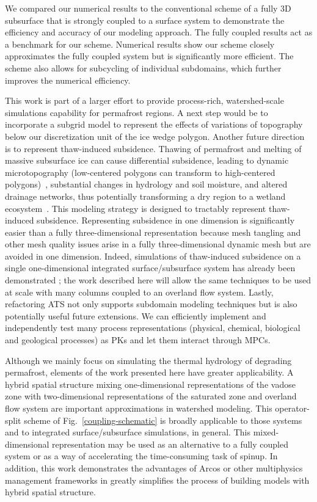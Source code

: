 \documentclass[review]{elsarticle}
\begin{document}
We compared our numerical results to the conventional scheme of a fully 3D subsurface that is strongly coupled to a surface system to demonstrate the efficiency and accuracy of our modeling approach. The fully coupled results act as a benchmark for our scheme. Numerical results show our scheme closely approximates the fully coupled system but is significantly more efficient. The scheme also allows for subcycling of individual subdomains, which further improves the numerical efficiency. 

This work is part of a larger effort to provide process-rich, watershed-scale simulations capability for permafrost regions.  A next step would be to incorporate a subgrid model to represent the effects of  variations of topography below our discretization unit of the ice wedge polygon. Another future direction is to represent thaw-induced subsidence. Thawing of permafrost and melting of massive subsurface ice can cause differential subsidence, leading to dynamic microtopography (low-centered polygons can transform to high-centered polygons)~\cite{jorgenson2006abrupt,liljedahl2012ice}, substantial changes in hydrology and soil moisture, and altered drainage networks, thus potentially transforming a dry region to a wetland ecosystem~\cite{hinzman2005evidence,rowland2010arctic}. This modeling strategy is designed to tractably represent  thaw-induced subsidence. Representing subsidence in one dimension is significantly easier than a fully three-dimensional representation because mesh tangling and other mesh quality issues arise in a fully three-dimensional dynamic mesh but are avoided in one dimension. Indeed, simulations of thaw-induced subsidence on a single one-dimensional integrated surface/subsurface system has already been demonstrated \cite{painter2013modeling}; the work described here will allow the same techniques to be used at scale with many columns coupled to an overland flow system. Lastly, refactoring ATS not only supports subdomain modeling techniques but is also potentially useful future extensions. We can efficiently implement and independently test many process representations (physical, chemical, biological and geological processes) as PKs and let them interact through MPCs. 
 
Although we mainly focus on simulating the thermal hydrology of degrading permafrost, elements of the work presented here have greater applicability. A hybrid spatial structure mixing one-dimensional representations of the vadose zone with two-dimensional representations of the saturated zone and overland flow system are important approximations in watershed modeling.  This operator-split scheme of Fig.~\ref{coupling-schematic} is broadly applicable to those systems and to integrated surface/subsurface simulations, in general. This mixed-dimensional representation may be used as an alternative to a fully coupled system or as a way of accelerating the time-consuming task of spinup. In addition, this work demonstrates the advantages of Arcos or other multiphysics management frameworks in greatly simplifies the process of building models with hybrid spatial structure.
\end{document}
